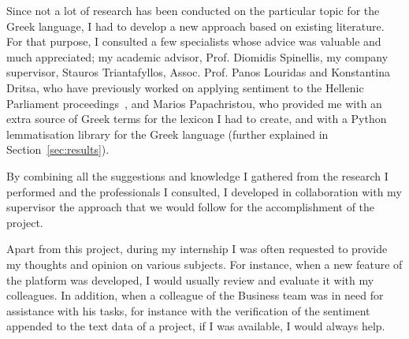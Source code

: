 Since not a lot of research has been conducted
on the particular topic for the Greek language,
I had to develop a new approach based on existing literature.
For that purpose, I consulted a few specialists
whose advice was valuable and much appreciated;
my academic advisor, Prof. Diomidis Spinellis,
my company supervisor, Stauros Triantafyllos,
Assoc. Prof. Panos Louridas and Konstantina Dritsa,
who have previously worked on applying sentiment
to the Hellenic Parliament proceedings~\cite{Dri18},
and Marios Papachristou,
who provided me with an extra source of Greek terms
for the lexicon I had to create,
and with a Python lemmatisation library for the Greek language
(further explained in Section~\ref{sec:results}).

By combining all the suggestions and knowledge I gathered
from the research I performed and the professionals I consulted,
I developed in collaboration with my supervisor
the approach that we would follow
for the accomplishment of the project.

Apart from this project,
during my internship I was often requested
to provide my thoughts and opinion on various subjects.
For instance, when a new feature of the platform was developed,
I would usually review and evaluate it with my colleagues.
In addition, when a colleague of the Business team
was in need for assistance with his tasks,
for instance with the verification of the sentiment appended
to the text data of a project,
if I was available, I would always help.
